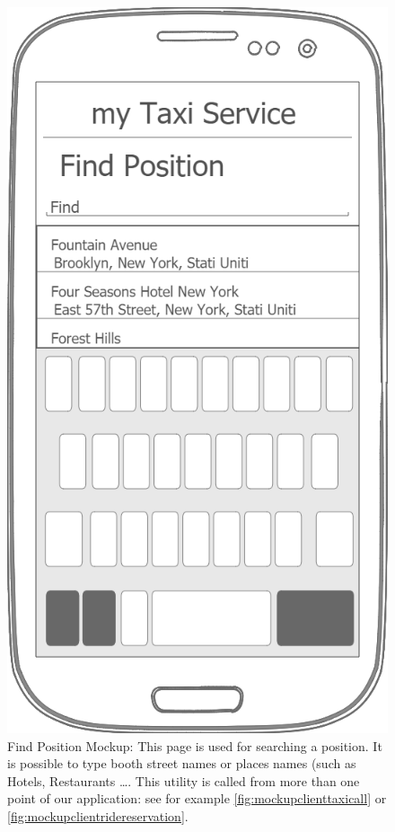 \documentclass[a4paper]{article}
\begin{document}
\begin{figure}[H]
\includegraphics[width=\mockupWidth]{Mockup-ClientsPositionFinder}
\centering
\caption[Find Position Mockup]{Find Position Mockup: \newline This page is used for searching a position. It is possible to type booth street names or places names (such as Hotels, Restaurants \ldots. This utility is called from more than one point of our application: see for example \autoref{fig:mockupclienttaxicall} or  \autoref{fig:mockupclientridereservation}.}
\label{fig:mockupclientfindposition}
\end{figure}
\end{document}

